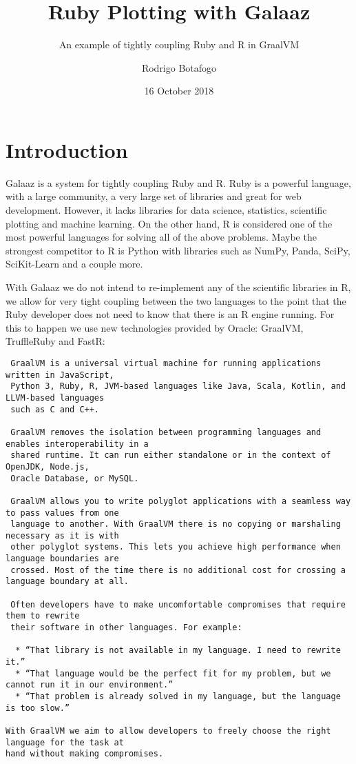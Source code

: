 \documentclass[]{article}
\title{Ruby Plotting with Galaaz}
\subtitle{An example of tightly coupling Ruby and R in GraalVM}
\author{Rodrigo Botafogo}
\date{16 October 2018}
\begin{document}
\maketitle

\section{Introduction}\label{introduction}

Galaaz is a system for tightly coupling Ruby and R. Ruby is a powerful
language, with a large community, a very large set of libraries and
great for web development. However, it lacks libraries for data science,
statistics, scientific plotting and machine learning. On the other hand,
R is considered one of the most powerful languages for solving all of
the above problems. Maybe the strongest competitor to R is Python with
libraries such as NumPy, Panda, SciPy, SciKit-Learn and a couple more.

With Galaaz we do not intend to re-implement any of the scientific
libraries in R, we allow for very tight coupling between the two
languages to the point that the Ruby developer does not need to know
that there is an R engine running. For this to happen we use new
technologies provided by Oracle: GraalVM, TruffleRuby and FastR:

\begin{verbatim}
 GraalVM is a universal virtual machine for running applications written in JavaScript,
 Python 3, Ruby, R, JVM-based languages like Java, Scala, Kotlin, and LLVM-based languages
 such as C and C++.

 GraalVM removes the isolation between programming languages and enables interoperability in a
 shared runtime. It can run either standalone or in the context of OpenJDK, Node.js,
 Oracle Database, or MySQL.

 GraalVM allows you to write polyglot applications with a seamless way to pass values from one
 language to another. With GraalVM there is no copying or marshaling necessary as it is with
 other polyglot systems. This lets you achieve high performance when language boundaries are
 crossed. Most of the time there is no additional cost for crossing a language boundary at all.

 Often developers have to make uncomfortable compromises that require them to rewrite
 their software in other languages. For example:

  * “That library is not available in my language. I need to rewrite it.” 
  * “That language would be the perfect fit for my problem, but we cannot run it in our environment.” 
  * “That problem is already solved in my language, but the language is too slow.”

With GraalVM we aim to allow developers to freely choose the right language for the task at
hand without making compromises.
\end{verbatim}
\end{document}

